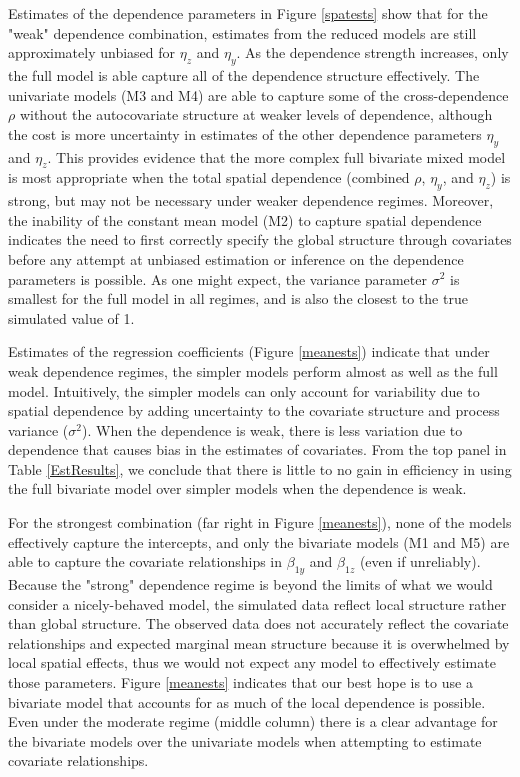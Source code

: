 \documentclass[12pt, a4paper, twoside]{article}
\begin{document}
Estimates of the dependence parameters in Figure \ref{spatests} show that for the "weak" dependence combination, estimates from the reduced models are still approximately unbiased for $\eta_z$ and $\eta_y$. As the dependence strength increases, only the full model is able capture all of the dependence structure effectively. The univariate models (M3 and M4) are able to capture some of the cross-dependence $\rho$ without the autocovariate structure at weaker levels of dependence, although the cost is more uncertainty in estimates of the other dependence parameters $\eta_y$ and $\eta_z$. This provides evidence that the more complex full bivariate mixed model is most appropriate when the total spatial dependence (combined $\rho$, $\eta_y$, and $\eta_z$) is strong, but may not be necessary under weaker dependence regimes. Moreover, the inability of the constant mean model (M2) to capture spatial dependence indicates the need to first correctly specify the global structure through covariates before any attempt at unbiased estimation or inference on the dependence parameters is possible. As one might expect, the variance parameter $\sigma^2$ is smallest for the full model in all regimes, and is also the closest to the true simulated value of 1.

Estimates of the regression coefficients (Figure \ref{meanests}) indicate that under weak dependence regimes, the simpler models perform almost as well as the full model. Intuitively, the simpler models can only account for variability due to spatial dependence by adding uncertainty to the covariate structure and process variance ($\sigma^2$). When the dependence is weak, there is less variation due to dependence that causes bias in the estimates of covariates. From the top panel in Table \ref{EstResults}, we conclude that there is little to no gain in efficiency in using the full bivariate model over simpler models when the dependence is weak.

For the strongest combination (far right in Figure \ref{meanests}), none of the models effectively capture the intercepts, and only the bivariate models (M1 and M5) are able to capture the covariate relationships in $\beta_{1y}$ and $\beta_{1z}$ (even if unreliably). Because the "strong" dependence regime is beyond the limits of what we would consider a nicely-behaved model, the simulated data reflect local structure rather than global structure. The observed data does not accurately reflect the covariate relationships and expected marginal mean structure because it is overwhelmed by local spatial effects, thus we would not expect any model to effectively estimate those parameters. Figure \ref{meanests} indicates that our best hope is to use a bivariate model that accounts for as much of the local dependence is possible. Even under the moderate regime (middle column) there is a clear advantage for the bivariate models over the univariate models when attempting to estimate covariate relationships.
\end{document}
